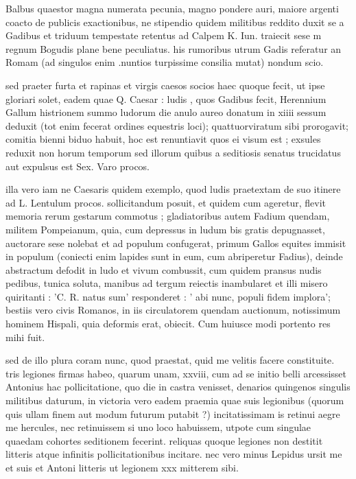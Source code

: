 


 Balbus quaestor magna numerata pecunia, magno pondere auri, maiore argenti coacto de publicis exactionibus, ne stipendio quidem militibus reddito duxit se a Gadibus et triduum tempestate retentus ad Calpem K. Iun. traiecit sese m regnum Bogudis plane bene peculiatus. his rumoribus utrum Gadis referatur an Romam (ad singulos enim .nuntios turpissime consilia mutat) nondum scio.

 sed praeter furta et rapinas et virgis caesos socios haec quoque fecit, ut ipse gloriari solet, eadem quae Q. Caesar : ludis , quos Gadibus fecit, Herennium Gallum histrionem summo ludorum die anulo aureo donatum in xiiii sessum deduxit (tot enim fecerat ordines equestris loci); quattuorviratum sibi prorogavit; comitia bienni biduo habuit, hoc est renuntiavit quos ei visum est ; exsules reduxit non horum temporum sed illorum quibus a seditiosis senatus trucidatus aut expulsus est Sex. Varo procos.

 illa vero iam ne Caesaris quidem exemplo, quod ludis praetextam de suo itinere ad L. Lentulum procos. sollicitandum posuit, et quidem cum ageretur, flevit memoria rerum gestarum commotus ; gladiatoribus autem Fadium quendam, militem Pompeianum, quia, cum depressus in ludum bis gratis depugnasset, auctorare sese nolebat et ad populum confugerat, primum Gallos equites immisit in populum (coniecti enim lapides sunt in eum, cum abriperetur Fadius), deinde abstractum defodit in ludo et vivum combussit, cum quidem pransus nudis pedibus, tunica soluta, manibus ad tergum reiectis inambularet et illi misero quiritanti : 'C. R. natus sum' responderet : ' abi nunc, populi fidem implora'; bestiis vero civis Romanos, in iis circulatorem quendam auctionum, notissimum hominem Hispali, quia deformis erat, obiecit. Cum huiusce modi portento res mihi fuit.

 sed de illo plura coram nunc, quod praestat, quid me velitis facere constituite. tris legiones firmas habeo, quarum unam, xxviii, cum ad se initio belli arcessisset Antonius hac pollicitatione, quo die in castra venisset, denarios quingenos singulis militibus daturum, in victoria vero eadem praemia quae suis legionibus (quorum quis ullam finem aut modum futurum putabit ?) incitatissimam is retinui aegre me hercules, nec retinuissem si uno loco habuissem, utpote cum singulae quaedam cohortes seditionem fecerint. reliquas quoque legiones non destitit litteris atque infinitis pollicitationibus incitare. nec vero minus Lepidus ursit me et suis et Antoni litteris ut legionem xxx mitterem sibi.

